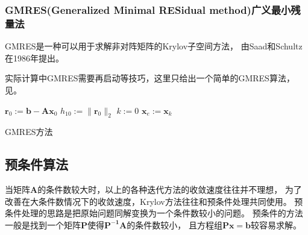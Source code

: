 \subsubsection{GMRES(Generalized Minimal RESidual method)广义最小残量法}
GMRES是一种可以用于求解非对阵矩阵的Krylov子空间方法，
由Saad和Schultz在1986年提出。\cite{saad1986gmres}

实际计算中GMRES需要再启动等技巧，这里只给出一个简单的GMRES算法，
见。\cite{golub2012matrix}

\begin{algorithm}

$\bm{r}_0 := \bm{b}-\bm{A}\bm{x}_0$ \algoend
$h_{10}:=\| \bm{r}_0\|_2$ \algoend
$k:=0$\;
$\bm{x}_e:=\bm{x}_k$\;
\caption{\label{alg:gpu.gmres}GMRES方法}
\end{algorithm}


\subsection{预条件算法}
\label{sec:gpu.krylov-precond}
当矩阵$\bm{A}$的条件数较大时，以上的各种迭代方法的收敛速度往往并不理想，
为了改善在大条件数情况下的收敛速度，Krylov方法往往和预条件处理共同使用。
预条件处理的思路是把原始问题同解变换为一个条件数较小的问题。
预条件的方法一般是找到一个矩阵$\bm{P}$使得$\bm{P^{-1}A}$的条件数较小，
且方程组$\bm{Px}=\bm{b}$较容易求解。\cite{saad2003iterative}


